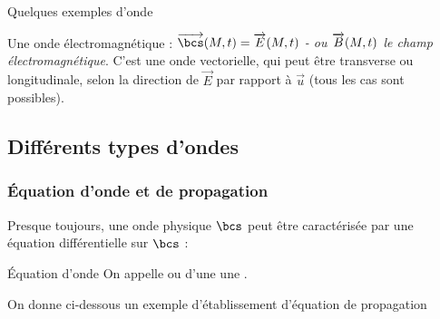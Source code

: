 \documentclass[a4paper,french,bookmarks]{book}
\begin{document}
\begin{example}{Quelques exemples d'onde}{}
\begin{center}
        \end{center}
        \begin{enumerate}
            \itt Une onde électromagnétique : $\vec\bcs\p{M,t} = \vec E\p{M,t}$ \emph{- ou $\overrightarrow{B}\!\left(M,t\right)$ le champ électromagnétique}. C'est une onde vectorielle, qui peut être transverse ou longitudinale, selon la direction de $\vec{E}$ par rapport à $\vec{u}$ (tous les cas sont possibles).
       \end{enumerate}
    \end{example}
    
    \subsection{Différents types d'ondes}

    \subsubsection{Équation d'onde et de propagation}
    
    Presque toujours, une onde physique $\bcs$ peut être caractérisée par une équation différentielle sur $\bcs$ :

    \begin{definition}{Équation d'onde}{}
        On appelle  ou  d'une  une .
    \end{definition}
    
    On donne ci-dessous un exemple d'établissement d'équation de propagation
    
\end{document}
